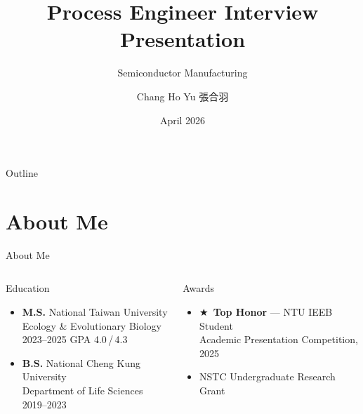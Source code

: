 \documentclass[aspectratio=169,10pt]{beamer}
\title[Process Engineer Interview]{Process Engineer Interview Presentation}
\subtitle{Semiconductor Manufacturing}
\author[Chang Ho Yu]{Chang Ho Yu \quad 張合羽}
\institute{M.S. Biological Sciences, National Taiwan University}
\date{April 2026}
\begin{document}
\begin{frame}
  \titlepage
\end{frame}

\begin{frame}{Outline}
  \tableofcontents
\end{frame}

\section{About Me}
\begin{frame}{About Me}
  \begin{columns}[T]
      \begin{block}{Education}
        \small
        \begin{itemize}
          \item \textbf{M.S.} National Taiwan University\\
                Ecology \& Evolutionary Biology\\
                {\footnotesize 2023--2025 \quad GPA 4.0\,/\,4.3}
          \item \textbf{B.S.} National Cheng Kung University\\
                Department of Life Sciences\\
                {\footnotesize 2019--2023}
        \end{itemize}
      \end{block}
      \vspace{0.1cm}
      \begin{block}{Awards}
        \small
        \begin{itemize}
          \item $\bigstar$\ \textbf{Top Honor} — NTU IEEB Student\\
                Academic Presentation Competition, 2025
          \item NSTC Undergraduate Research Grant
        \end{itemize}
      \end{block}


\end{columns}
\end{frame}
\end{document}
